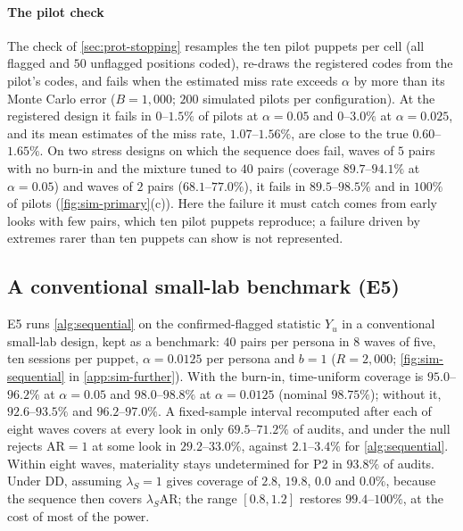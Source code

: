 \paragraph{The pilot check} The check of \cref{sec:prot-stopping} resamples the ten pilot puppets per cell (all flagged and $50$ unflagged positions coded), re-draws the registered codes from the pilot's codes, and fails when the estimated miss rate exceeds $\alpha$ by more than its Monte Carlo error ($B=1{,}000$; $200$ simulated pilots per configuration). At the registered design it fails in $0$--$1.5\%$ of pilots at $\alpha=0.05$ and $0$--$3.0\%$ at $\alpha=0.025$, and its mean estimates of the miss rate, $1.07$--$1.56\%$, are close to the true $0.60$--$1.65\%$. On two stress designs on which the sequence does fail, waves of $5$ pairs with no burn-in and the mixture tuned to $40$ pairs (coverage $89.7$--$94.1\%$ at $\alpha=0.05$) and waves of $2$ pairs ($68.1$--$77.0\%$), it fails in $89.5$--$98.5\%$ and in $100\%$ of pilots (\cref{fig:sim-primary}(c)). Here the failure it must catch comes from early looks with few pairs, which ten pilot puppets reproduce; a failure driven by extremes rarer than ten puppets can show is not represented.

\subsection{A conventional small-lab benchmark (E5)}\label{sec:sim-benchmark}

E5 runs \cref{alg:sequential} on the confirmed-flagged statistic $Y_u$ in a conventional small-lab design, kept as a benchmark: $40$ pairs per persona in $8$ waves of five, ten sessions per puppet, $\alpha=0.0125$ per persona and $b=1$ ($R=2{,}000$; \cref{fig:sim-sequential} in \cref{app:sim-further}). With the burn-in, time-uniform coverage is $95.0$--$96.2\%$ at $\alpha=0.05$ and $98.0$--$98.8\%$ at $\alpha=0.0125$ (nominal $98.75\%$); without it, $92.6$--$93.5\%$ and $96.2$--$97.0\%$. A fixed-sample interval recomputed after each of eight waves covers at every look in only $69.5$--$71.2\%$ of audits, and under the null rejects $\mathrm{AR}=1$ at some look in $29.2$--$33.0\%$, against $2.1$--$3.4\%$ for \cref{alg:sequential}. Within eight waves, materiality stays undetermined for P2 in $93.8\%$ of audits. Under DD, assuming $\lambda_S=1$ gives coverage of $2.8$, $19.8$, $0.0$ and $0.0\%$, because the sequence then covers $\lambda_S\mathrm{AR}$; the range $[0.8,1.2]$ restores $99.4$--$100\%$, at the cost of most of the power.


